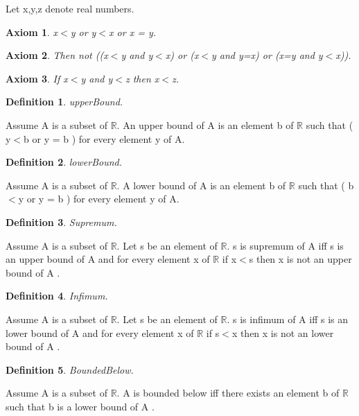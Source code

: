 \documentclass{article}
\newenvironment{forthel}{\begin{leftbar}}{\end{leftbar}}
\newtheorem{axiom}{Axiom}
\newtheorem{definition}{Definition}
\begin{document}
\begin{forthel}
Let x,y,z denote real numbers.

\begin{axiom} x$<$y or y$<$x or x = y.

\end{axiom}

\begin{axiom} Then not ((x$<$y and y$<$x) or (x$<$y and y=x) or (x=y and y$<$x)).

\end{axiom}
\begin{axiom} If x$<$y and y$<$z then x$<$z.

\end{axiom}



\begin{definition} upperBound.

\end{definition}
Assume A is a subset of $\mathbb{R}$.
An upper bound of A is an element b of $\mathbb{R}$ such that ( y$<$b or y = b ) for every element y of A.

\begin{definition} lowerBound.

\end{definition}
Assume A is a subset of $\mathbb{R}$.
A lower bound of A is an element b of $\mathbb{R}$ such that ( b$<$y or y = b ) for every element y of A.

\begin{definition} Supremum.

\end{definition}
Assume A is a subset of $\mathbb{R}$.
Let s be an element of $\mathbb{R}$.
s is supremum of A  iff s is an upper bound of A 
and for every element x of $\mathbb{R}$ if x$<$s then x is not an upper bound of A .

\begin{definition} Infimum.

\end{definition}
Assume A is a subset of $\mathbb{R}$.
Let s be an element of $\mathbb{R}$.
s is infimum of A  iff s is an lower bound of A 
and for every element x of $\mathbb{R}$ if s$<$x then x is not an lower bound of A .

\begin{definition} BoundedBelow.

\end{definition}
Assume A is a subset of $\mathbb{R}$.
A is bounded below  iff 
there exists an element b of $\mathbb{R}$ such that b is a lower bound of A .


\end{forthel}
\end{document}
